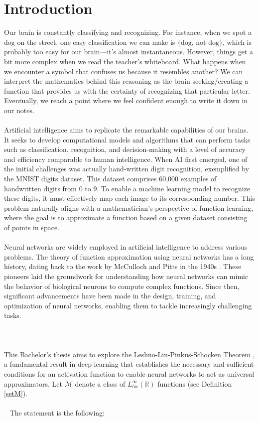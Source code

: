 \documentclass[../main.tex]{subfiles}
\begin{document}
    \chapter{Introduction} \label{ch:intro}
    


\noindent Our brain is constantly classifying and recognizing. For instance, when we spot a dog on the street, one easy classification we can make is  $\{ \text{dog, not dog} \}$, which is probably too easy for our brain—it's almost instantaneous.  However, things get a bit more complex when we read the teacher's whiteboard. What happens when we encounter a symbol that confuses us because it resembles another?
We can interpret the mathematics behind this reasoning as the brain seeking/creating a function that provides us with the certainty of recognizing that particular letter. Eventually, we reach a point where we feel confident enough to write it down in our notes. \\ \\
Artificial intelligence aims to replicate the remarkable capabilities of our brains. It seeks to develop computational models and algorithms that can perform tasks such as classification, recognition, and decision-making with a level of accuracy and efficiency comparable to human intelligence. When AI first emerged, one of the initial challenges was actually hand-written digit recognition, exemplified by the MNIST digits dataset. This dataset comprises 60,000 examples of handwritten digits from 0 to 9. To enable a machine learning model to recognize these digits, it must effectively map each image to its corresponding number.
This problem naturally aligns with a mathematician's perspective of function learning, where the goal is to approximate a function based on a given dataset consisting of points in space.
\\ \\ 
Neural networks are widely employed in artificial intelligence to address various problems. The theory of function approximation using neural networks has a long history, dating back to the work by McCulloch and Pitts in the 1940s \cite{McCulloch1943}. These pioneers laid the groundwork for understanding how neural networks can mimic the behavior of biological neurons to compute complex functions. Since then, significant advancements have been made in the design, training, and optimization of neural networks, enabling them to tackle increasingly challenging tasks.
\\ \\  \\ \\ 
This Bachelor's thesis aims to explore the Leshno-Lin-Pinkus-Schocken Theorem \cite{leshno1993multilayer}, a fundamental result in deep learning that establishes the necessary and sufficient conditions for an activation function to enable neural networks to act as universal approximators. Let $\mathcal{M}$ denote a class of  $L_{loc}^{\infty}(\mathbb{R})$ functions (see Definition  \ref{setM}). 
\\ \\ 
The statement is the following:
\end{document}
